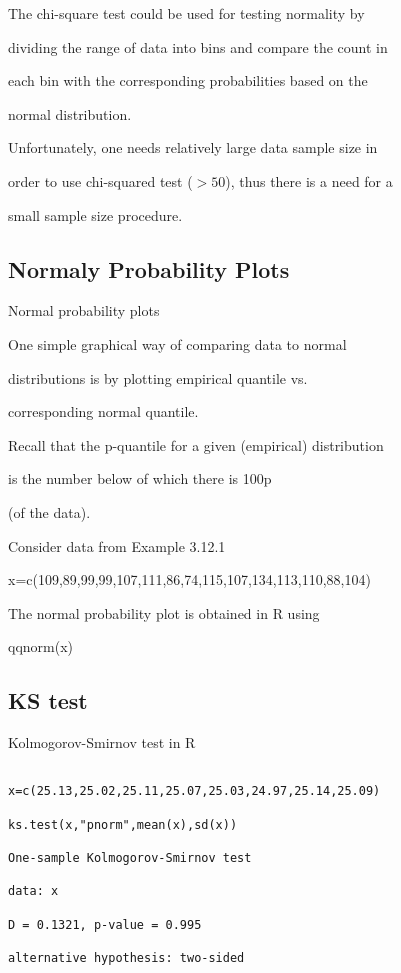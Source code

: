The chi-square test could be used for testing normality by

dividing the range of data into bins and compare the count in

each bin with the corresponding probabilities based on the

normal distribution.

Unfortunately, one needs relatively large data sample size in

order to use chi-squared test ($> 50$), thus there is a need for a

small sample size procedure.

 

\subsection{Normaly Probability Plots}


Normal probability plots

One simple graphical way of comparing data to normal

distributions is by plotting empirical quantile vs.

corresponding normal quantile.

Recall that the p-quantile for a given (empirical) distribution

is the number below of which there is 100p%

(of the data).

Consider data from Example 3.12.1

x=c(109,89,99,99,107,111,86,74,115,107,134,113,110,88,104)

The normal probability plot is obtained in R using

qqnorm(x)

 


\subsection{KS test}

 


 

Kolmogorov-Smirnov test in R

\begin{verbatim}

x=c(25.13,25.02,25.11,25.07,25.03,24.97,25.14,25.09)

ks.test(x,"pnorm",mean(x),sd(x))

One-sample Kolmogorov-Smirnov test

data: x

D = 0.1321, p-value = 0.995

alternative hypothesis: two-sided

\end{verbatim}

